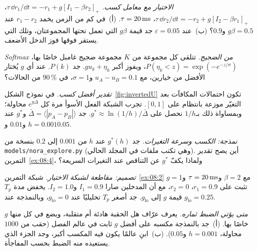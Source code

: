 \begin{exercise}[\lvlB]
\label{ex:08:2}
\emph{الاختيار مع معامل كسب.} $\tau\,\dd r_1/\dd t=-r_1+g[I_1-\beta r_2]_+$، $\tau\,\dd r_2/\dd t=-r_2+g[I_2-\beta r_1]_+$، $\tau=20\,\text{ms}$. (أ)~في كم من الزمن يخمد $r_1-r_2$ عند $g\beta=0.5$ و$0.9$؟ (ب)~عند $\varepsilon=0.05$ جد قيمة $g\beta$ التي تعمل تحتها المجموعتان، وتلك التي يستقر فوقها فوز الدخل الأضعف.
\end{exercise}

\begin{exercise}[\lvlA]
\label{ex:08:3}
\emph{\foreignlanguage{english}{Softmax} من الضجيج.} تتلقى كل مجموعة من $K$ مجموعة ضجيج غامبل خاصًا بها، $P(\eta_k<z)=\exp(-e^{-z/\sigma})$، ويفوز أكبر $gu_k+\eta_k$. جد $P(k)$. عند أي $g$ يُختار الأفضل من خيارين، مع $u_A-u_B=0.1$ و$\sigma=1$، في $90\,\%$ من الحالات؟
\end{exercise}

\begin{exercise}[\lvlB]
\label{ex:08:4}
\emph{تقدير أفضل كسب.} في نموذج الشكل~\ref{fig:invertedU} تكون احتمالات المكافآت بعد التغيّر موزعة بانتظام على $[0,1]$. تجرب الشبكة الفعل الأسوأ مرة كل $e^{g\Delta}$ محاولة؛ وبمساواة ذلك بـ$1/h$ نحصل على $g^*\approx\ln(1/h)/\bar\Delta$. جد $\bar\Delta=\langle|p_A-p_B|\rangle$ و$g^*$ عند $h=0.001$ و$0.01$ و$0.05$.
\end{exercise}

\begin{exercise}[\lvlB]
\label{ex:08:5}
\emph{نمذجة: الكسب وسرعة التغيرات.} جد $g^*(h)$ عند $h$ من $0.001$ إلى $0.2$ بنسخة من \texttt{models/\allowbreak nora\_explore.py} (وهي تكتب ملفات في المجلد الحالي). أين يصح تقدير التمرين~\ref{ex:08:4}، ولماذا يكفّ $g^*$ عن التناقص عند التغيرات السريعة؟
\end{exercise}

\begin{exercise}[\lvlB]
\label{ex:08:6}
\emph{تصميم: مقاطعة لشبكة الاختيار.} شبكة التمرين~\ref{ex:08:2} مع $\beta=2$ و$\tau=20\,\text{ms}$ و$g=1$ تثبت على $r_1=0.9$، $r_2=0$، مع أن المدخلين صارا $I_1=0.9$ و$I_2=1.0$. يخفض  مدة $T_p$ قيمة $g$ إلى $g_{\text{lo}}$. جد أصغر $T_p$ تحليليًا عند $g_{\text{lo}}=0$، وبالنمذجة عند $g_{\text{lo}}=0.25$.
\end{exercise}

\begin{exercise}[\lvlC]
\label{ex:08:7}
\emph{متى يؤتي الضبط ثماره.} يعرف عرّاف هل الحقبة هادئة أم متقلبة، ويضع في كل منها $g$ خاصًا بها. (أ)~جد بالنمذجة مكسبه على أفضل $g$ ثابت في عالم الفصل (حقب من $1000$ محاولة، $h=0.001$ و$0.05$). (ب)~ابنِ عالمًا يكون فيه المكسب أكبر، وجد الجزء الذي يستعيده منه الضبط بحسب المفاجأة.
\end{exercise}
